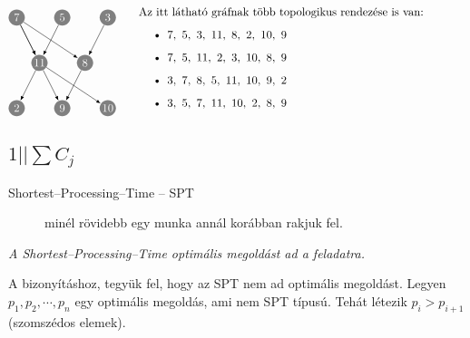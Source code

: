 \[ \parbox[l]{4cm}{
		\begin{tikzpicture}[scale=0.7]
			\tikzset{ p/.style={circle,white,fill=gray,inner sep=0pt,minimum size=0.5cm},
			}
			\node[p] (7) at (-2, 2) {$7$};
			\node[p] (5) at (0, 2) {$5$};
			\node[p] (3) at (2, 2) {$3$};
			\node[p] (11) at (-1, 0) {$11$};
			\node[p] (8) at (1, 0) {$8$};
			\node[p] (2) at (-2, -2) {$2$};
			\node[p] (9) at (0, -2) {$9$};
			\node[p] (10) at (2, -2) {$10$};

			\draw[-latex] (7) -- (11) node [midway, above] {};
			\draw[-latex] (7) -- (8) node [midway, above] {};
			\draw[-latex] (5) -- (11) node [midway, above] {};
			\draw[-latex] (3) -- (8) node [midway, above] {};
			\draw[-latex] (7) -- (11) node [midway, above] {};
			\draw[-latex] (11) -- (2) node [midway, above] {};
			\draw[-latex] (11) -- (9) node [midway, above] {};
			\draw[-latex] (11) -- (10) node [midway, above] {};
			\draw[-latex] (8) -- (9) node [midway, above] {};
		\end{tikzpicture}}
	\parbox[l]{10cm}{
		Az itt látható gráfnak több topologikus rendezése is van:

		\begin{itemize}
			\item $7,~5,~3,~11,~8,~2,~10,~9$
			\item $7,~5,~11,~2,~3,~10,~8,~9$
			\item $3,~7,~8,~5,~11,~10,~9,~2$
			\item $3,~5,~7,~11,~10,~2,~8,~9$
		\end{itemize}
	}\]

\subsection{ \texorpdfstring {$ 1||\sum C_j$} {1||SumCj} }

\begin{description}
	\item[Shortest--Processing--Time -- SPT] minél rövidebb egy munka annál korábban
	      rakjuk fel.
\end{description}

\emph{A Shortest--Processing--Time optimális megoldást ad a feladatra.}
\vspace{0.4cm}

A bizonyításhoz, tegyük fel, hogy az SPT nem ad optimális megoldást. Legyen
$p_1, p_2, \cdots, p_n$ egy optimális megoldás, ami nem SPT típusú. Tehát
létezik $p_i>p_{i+1}$ (szomszédos elemek).

